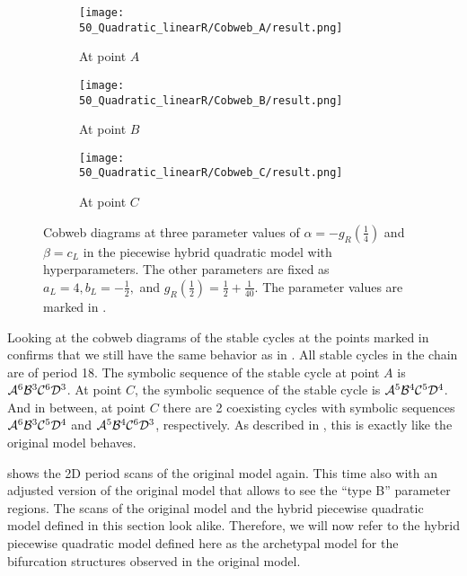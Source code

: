 \begin{figure}
	\centering
	\begin{subfigure}{0.3\textwidth}
		\centering
		\texttt{[image: 50\_Quadratic\_linearR/Cobweb\_A/result.png]}
		\caption{At point $A$}
		\label{fig:setup.quad.hybrid.cobweb.A}
	\end{subfigure}
	\begin{subfigure}{0.3\textwidth}
		\centering
		\texttt{[image: 50\_Quadratic\_linearR/Cobweb\_B/result.png]}
		\caption{At point $B$}
		\label{fig:setup.quad.hybrid.cobweb.B}
	\end{subfigure}
	\begin{subfigure}{0.3\textwidth}
		\centering
		\texttt{[image: 50\_Quadratic\_linearR/Cobweb\_C/result.png]}
		\caption{At point $C$}
		\label{fig:setup.quad.hybrid.cobweb.C}
	\end{subfigure}
	\caption[Cobwebs of the piecewise hybrid quadratic model with hyperparameters]{
		Cobweb diagrams at three parameter values of $\alpha = -g_R\left(\frac{1}{4}\right)$ and $\beta = c_L$ in the piecewise hybrid quadratic model with hyperparameters.
		The other parameters are fixed as $a_L = 4, b_L = -\frac{1}{2},$ and $g_R\left(\frac{1}{2}\right) = \frac{1}{2} + \frac{1}{40}$.
		The parameter values are marked in .
	}
	\label{fig:setup.quad.hybrid.cobwebs}
\end{figure}

Looking at the cobweb diagrams of the stable cycles at the points marked in  confirms that we still have the same behavior as in .
All stable cycles in the chain are of period 18.
The symbolic sequence of the stable cycle at point $A$ is $\mathcal{A}^6\mathcal{B}^3\mathcal{C}^6\mathcal{D}^3$.
At point $C$, the symbolic sequence of the stable cycle is $\mathcal{A}^5\mathcal{B}^4\mathcal{C}^5\mathcal{D}^4$.
And in between, at point $C$ there are 2 coexisting cycles with symbolic sequences $\mathcal{A}^6\mathcal{B}^3\mathcal{C}^5\mathcal{D}^4$ and $\mathcal{A}^5\mathcal{B}^4\mathcal{C}^6\mathcal{D}^3$, respectively.
As described in , this is exactly like the original model behaves.

 shows the 2D period scans of the original model again.
This time also with an adjusted version of the original model that allows to see the ``type B'' parameter regions.
The scans of the original model and the hybrid piecewise quadratic model defined in this section look alike.
Therefore, we will now refer to the hybrid piecewise quadratic model defined here as the archetypal model for the bifurcation structures observed in the original model.

